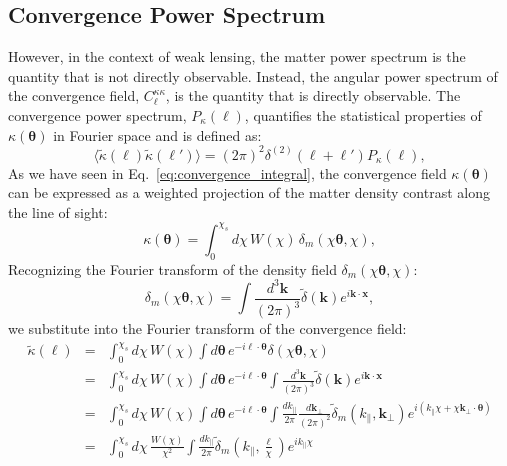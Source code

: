 \subsection{Convergence Power Spectrum}
However, in the context of weak lensing, the matter power spectrum is the quantity that is not directly observable. Instead, the angular power spectrum of the convergence field, \( C_{\ell}^{\kappa\kappa} \), is the quantity that is directly observable.
The convergence power spectrum, \( P_{\kappa}(\ell) \), quantifies the statistical properties of \( \kappa(\boldsymbol{\theta}) \) in Fourier space and is defined as:
\begin{equation}
    \langle \tilde{\kappa}(\boldsymbol{\ell}) \tilde{\kappa}(\boldsymbol{\ell}') \rangle = (2\pi)^2 \delta^{(2)}(\boldsymbol{\ell} + \boldsymbol{\ell}') P_{\kappa}(\ell),
    \label{eq:convergence_power_spectrum}
\end{equation}
As we have seen in Eq.~\eqref{eq:convergence_integral}, the convergence field \( \kappa(\boldsymbol{\theta}) \) can be expressed as a weighted projection of the matter density contrast along the line of sight:
\begin{equation}
    \kappa(\boldsymbol{\theta}) = \int_0^{\chi_s} d\chi \, W(\chi) \, \delta_m\left(\chi \boldsymbol{\theta}, \chi\right),
\end{equation}
Recognizing the Fourier transform of the density field \( \delta_m\left(\chi \boldsymbol{\theta}, \chi\right) \):
\begin{equation}
    \delta_m\left(\chi \boldsymbol{\theta}, \chi\right) = \int \frac{d^3\mathbf{k}}{(2\pi)^3} \tilde{\delta}(\mathbf{k}) e^{i \mathbf{k} \cdot \mathbf{x}},
\end{equation}
we substitute into the Fourier transform of the convergence field:
\begin{eqnarray}
    \tilde{\kappa}(\boldsymbol{\ell}) &=& \int_0^{\chi_s} d\chi \, W(\chi) \int d\boldsymbol{\theta} \, e^{-i \boldsymbol{\ell} \cdot \boldsymbol{\theta}} \delta\left(\chi \boldsymbol{\theta}, \chi\right) \nonumber \\
    &=& \int_0^{\chi_s} d\chi \, W(\chi) \int d\boldsymbol{\theta} \, e^{-i \boldsymbol{\ell} \cdot \boldsymbol{\theta}} \int \frac{d^3\mathbf{k}}{(2\pi)^3} \tilde{\delta}(\mathbf{k}) e^{i \mathbf{k} \cdot \mathbf{x}} \nonumber \\
    &=& \int_0^{\chi_s} d\chi \, W(\chi) \int d\boldsymbol{\theta} \, e^{-i \boldsymbol{\ell} \cdot \boldsymbol{\theta}} \int \frac{dk_\parallel}{2\pi}\frac{d\mathbf{k}_\perp}{(2\pi)^2} \tilde{\delta}_m(k_\parallel, \mathbf{k}_\perp) e^{i (k_\parallel \chi  + \chi \mathbf{k}_\perp \cdot \boldsymbol{\theta})} \nonumber \\
    &=& \int_0^{\chi_s} d\chi \, \frac{W(\chi)}{\chi^2} \int \frac{dk_\parallel}{2\pi} \tilde{\delta}_m\left(k_\parallel, \frac{\boldsymbol{\ell}}{\chi}\right) e^{i k_\parallel \chi}
    \label{eq:kappa_fourier_final}
\end{eqnarray}
